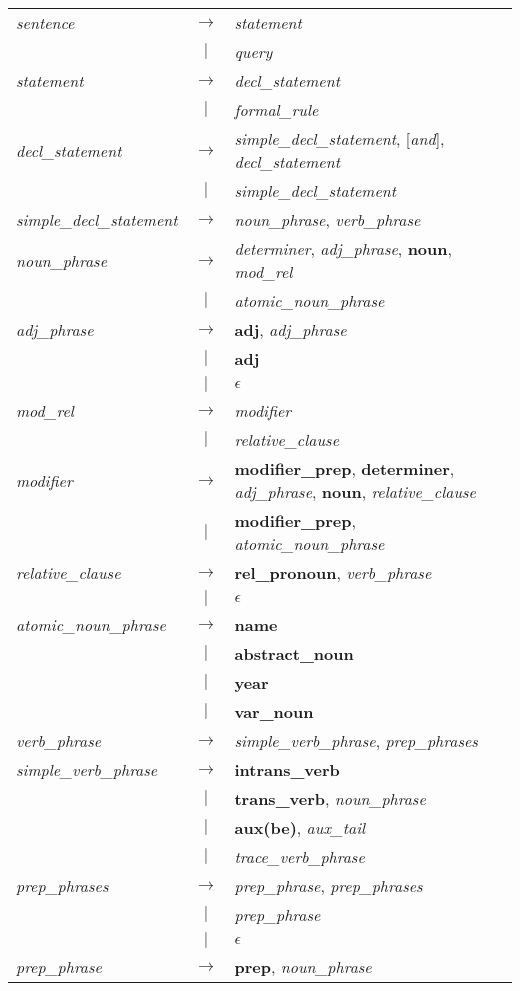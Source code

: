 \begin{tabular}{lcl}
{\sl sentence\/}         & $\rightarrow$ & {\sl statement\/}       \\
                         & $|$           & {\sl query\/}           \\
{\sl statement\/}        & $\rightarrow$ & {\sl decl\_statement\/} \\
                         & $|$           & {\sl formal\_rule\/}    \\
{\sl decl\_statement\/}  & $\rightarrow$ & {\sl
simple\_decl\_statement\/}, [{\sl and\/}], {\sl decl\_statement\/} \\
                         & $|$ & {\sl simple\_decl\_statement\/}   \\
{\sl simple\_decl\_statement\/} & $\rightarrow$ & {\sl noun\_phrase\/},
{\sl verb\_phrase\/} \\
{\sl noun\_phrase\/} & $\rightarrow$ & {\sl determiner\/}, {\sl
adj\_phrase\/}, {\bf noun}, {\sl mod\_rel\/} \\
                     & $|$ & {\sl atomic\_noun\_phrase\/} \\
{\sl adj\_phrase\/} & $\rightarrow$ & {\bf adj}, {\sl adj\_phrase\/}\\
& $|$ & {\bf adj} \\ & $|$ & $\epsilon$ \\
{\sl mod\_rel\/} & $\rightarrow$ & {\sl modifier\/}\\
& $|$ & {\sl relative\_clause\/} \\
{\sl modifier\/} & $\rightarrow$ & {\bf modifier\_prep}, {\bf
determiner}, {\sl adj\_phrase\/}, {\bf noun}, {\sl relative\_clause\/} \\
& $|$ & {\bf modifier\_prep}, {\sl atomic\_noun\_phrase\/}\\
{\sl relative\_clause\/} & $\rightarrow$ & {\bf rel\_pronoun}, {\sl
verb\_phrase\/} \\
& $|$ & $\epsilon$ \\
{\sl atomic\_noun\_phrase\/} & $\rightarrow$ & {\bf name} \\
& $|$ & {\bf abstract\_noun}\\ & $|$ & {\bf year} \\ & $|$ & {\bf
var\_noun} \\
{\sl verb\_phrase\/} & $\rightarrow$ & {\sl simple\_verb\_phrase\/},
{\sl prep\_phrases\/} \\
{\sl simple\_verb\_phrase\/} & $\rightarrow$ & {\bf intrans\_verb} \\
& $|$ & {\bf trans\_verb}, {\sl noun\_phrase\/} \\ & $|$ & {\bf
aux(be)}, {\sl aux\_tail\/} \\
& $|$ & {\sl trace\_verb\_phrase\/}\\
{\sl prep\_phrases\/} & $\rightarrow$ & {\sl prep\_phrase\/}, {\sl
prep\_phrases\/} \\
& $|$ & {\sl prep\_phrase\/} \\ & $|$ & $\epsilon$ \\
{\sl prep\_phrase\/} & $\rightarrow$ & {\bf prep}, {\sl
noun\_phrase\/}
\end{tabular}

